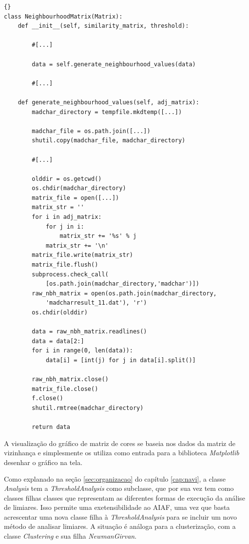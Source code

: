 \lstset{language=python}
\lstset{commentstyle=\textit}
\begin{lstlisting}[frame=trbl, caption=Geração de Matriz de Adjacências,label=lst:gennbhvalues]{}
class NeighbourhoodMatrix(Matrix):
    def __init__(self, similarity_matrix, threshold):
        
        #[...]
                    
        data = self.generate_neighbourhood_values(data)
                    
        #[...]
        
    def generate_neighbourhood_values(self, adj_matrix):
        madchar_directory = tempfile.mkdtemp([...])
        
        madchar_file = os.path.join([...])
        shutil.copy(madchar_file, madchar_directory)
        
        #[...]
        
        olddir = os.getcwd()
        os.chdir(madchar_directory)
        matrix_file = open([...])
        matrix_str = ''
        for i in adj_matrix:
            for j in i:
                matrix_str += '%s' % j
            matrix_str += '\n'
        matrix_file.write(matrix_str)
        matrix_file.flush()
        subprocess.check_call(
            [os.path.join(madchar_directory,'madchar')])
        raw_nbh_matrix = open(os.path.join(madchar_directory,
            'madcharresult_11.dat'), 'r')
        os.chdir(olddir)
        
        data = raw_nbh_matrix.readlines()
        data = data[2:]
        for i in range(0, len(data)):
            data[i] = [int(j) for j in data[i].split()]
        
        raw_nbh_matrix.close()
        matrix_file.close()
        f.close()
        shutil.rmtree(madchar_directory)
        
        return data
\end{lstlisting}

A visualização do gráfico de matriz de cores se baseia nos dados da matriz de vizinhança e simplesmente os utiliza como entrada para a biblioteca
\textit{Matplotlib} desenhar o gráfico na tela.

Como explanado na seção \ref{sec:organizacao} do capítulo \ref{cap:navi}, a classe \textit{Analysis} tem a \textit{ThresholdAnalysis} como subclasse,
que por sua vez tem como classes filhas classes que representam as diferentes formas de execução da análise de limiares. Isso permite uma exetensibilidade
ao AIAF, uma vez que basta acrescentar uma nova classe filha à \textit{ThresholdAnalysis} para se incluir um novo método de analisar limiares. A situação
é análoga para a clusterização, com a classe \textit{Clustering} e sua filha \textit{NewmanGirvan}.

